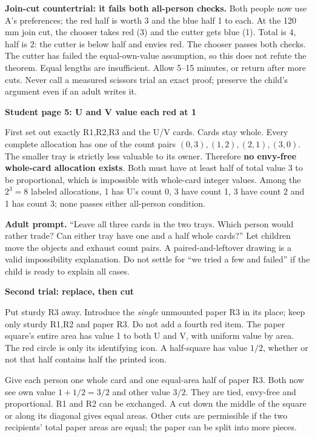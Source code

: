 \documentclass[11pt]{article}
\newcommand{\heading}[1]{\par\vspace{1.5mm}{\large\bfseries #1}\par\vspace{.8mm}}
\newcommand{\subhead}[1]{\par\vspace{1mm}\textbf{#1}\par}
\newcommand{\adult}[1]{\textbf{Adult prompt.} #1\par}
\newcommand{\page}[1]{\newpage\heading{#1}}
\begin{document}
\textbf{Join-cut countertrial: it fails both all-person checks.} Both people now use A's preferences; the red half is worth 3 and the blue half 1 to each. At the 120 mm join cut, the chooser takes red (3) and the cutter gets blue (1). Total is 4, half is 2: the cutter is below half and envies red. The chooser passes both checks. The cutter has failed the equal-own-value assumption, so this does not refute the theorem. Equal lengths are insufficient. Allow 5--15 minutes, or return after more cuts. Never call a measured scissors trial an exact proof; preserve the child's argument even if an adult writes it.

\page{Problem 5: an obstruction removed by a split}
\subhead{Student page 5: U and V value each red at 1}
First set out exactly R1,R2,R3 and the U/V cards. Cards stay whole. Every complete allocation has one of the count pairs $(0,3),(1,2),(2,1),(3,0)$. The smaller tray is strictly less valuable to its owner. Therefore \textbf{no envy-free whole-card allocation exists}. Both must have at least half of total value 3 to be proportional, which is impossible with whole-card integer values. Among the $2^3=8$ labeled allocations, 1 has U's count 0, 3 have count 1, 3 have count 2 and 1 has count 3; none passes either all-person condition.

\adult{``Leave all three cards in the two trays. Which person would rather trade? Can either tray have one and a half whole cards?'' Let children move the objects and exhaust count pairs. A paired-and-leftover drawing is a valid impossibility explanation. Do not settle for ``we tried a few and failed'' if the child is ready to explain all cases.}

\subhead{Second trial: replace, then cut}
Put sturdy R3 away. Introduce the \emph{single} unmounted paper R3 in its place; keep only sturdy R1,R2 and paper R3. Do not add a fourth red item. The paper square's entire area has value 1 to both U and V, with uniform value by area. The red circle is only its identifying icon. A half-square has value $1/2$, whether or not that half contains half the printed icon.

Give each person one whole card and one equal-area half of paper R3. Both now see own value $1+1/2=3/2$ and other value $3/2$. They are tied, envy-free and proportional. R1 and R2 can be exchanged. A cut down the middle of the square or along its diagonal gives equal areas. Other cuts are permissible if the two recipients' total paper areas are equal; the paper can be split into more pieces.
\end{document}
